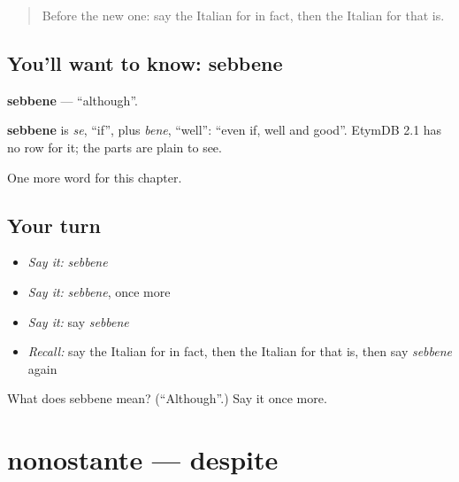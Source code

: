 \label{lesson:IT-C188-sebbene}



\begin{quote}
Before the new one: say the Italian for in fact, then the Italian for that is.
\end{quote}

\subsection*{You'll want to know: sebbene}
\textbf{sebbene} — \textquotedblleft{}although\textquotedblright{}.

\begin{cousinweb}
\textbf{sebbene} is \emph{se}, \textquotedblleft{}if\textquotedblright{}, plus \emph{bene}, \textquotedblleft{}well\textquotedblright{}: \textquotedblleft{}even if, well and good\textquotedblright{}. EtymDB 2.1 has no row for it; the parts are plain to see.
\end{cousinweb}

\begin{grammarlens}[title={What you've built}]
One more word for this chapter.
\end{grammarlens}

\subsection*{Your turn}
\begin{itemize}
\raggedright
  \item \emph{Say it:} \emph{sebbene}
  \item \emph{Say it:} \emph{sebbene}, once more
  \item \emph{Say it:} say \emph{sebbene}
  \item \emph{Recall:} say the Italian for in fact, then the Italian for that is, then say \emph{sebbene} again
\end{itemize}

\begin{tcolorbox}[breakable,colback=teal!4,colframe=teal!35!black,title={Before you move on}]
What does sebbene mean? (\textquotedblleft{}Although\textquotedblright{}.) Say it once more.
\end{tcolorbox}
\section[nonostante]{nonostante — despite}

\label{lesson:IT-C188-nonostante}



